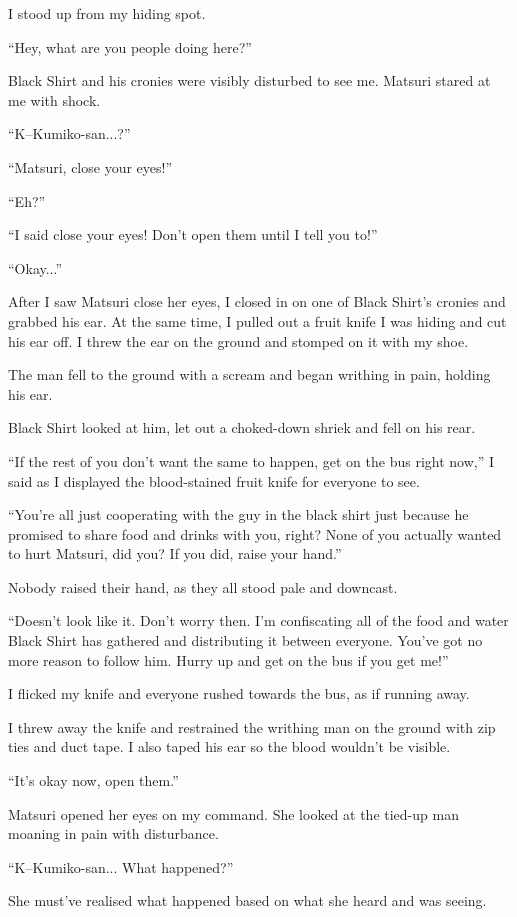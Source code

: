 I stood up from my hiding spot.

``Hey, what are you people doing here?''

Black Shirt and his cronies were visibly disturbed to see me. Matsuri stared at me with shock.

``K--Kumiko-san...?''

``Matsuri, close your eyes!''

``Eh?''

``I said close your eyes! Don't open them until I tell you to!''

``Okay...''

After I saw Matsuri close her eyes, I closed in on one of Black Shirt's cronies and grabbed his ear. At the same time, I pulled out a fruit knife I was hiding and cut his ear off. I threw the ear on the ground and stomped on it with my shoe.

The man fell to the ground with a scream and began writhing in pain, holding his ear.

Black Shirt looked at him, let out a choked-down shriek and fell on his rear.

``If the rest of you don't want the same to happen, get on the bus right now,'' I said as I displayed the blood-stained fruit knife for everyone to see.

``You're all just cooperating with the guy in the black shirt just because he promised to share food and drinks with you, right? None of you actually wanted to hurt Matsuri, did you? If you did, raise your hand.''

Nobody raised their hand, as they all stood pale and downcast.

``Doesn't look like it. Don't worry then. I'm confiscating all of the food and water Black Shirt has gathered and distributing it between everyone. You've got no more reason to follow him. Hurry up and get on the bus if you get me!''

I flicked my knife and everyone rushed towards the bus, as if running away.

I threw away the knife and restrained the writhing man on the ground with zip ties and duct tape. I also taped his ear so the blood wouldn't be visible.

``It's okay now, open them.''

Matsuri opened her eyes on my command. She looked at the tied-up man moaning in pain with disturbance.

``K--Kumiko-san... What happened?''

She must've realised what happened based on what she heard and was seeing.

